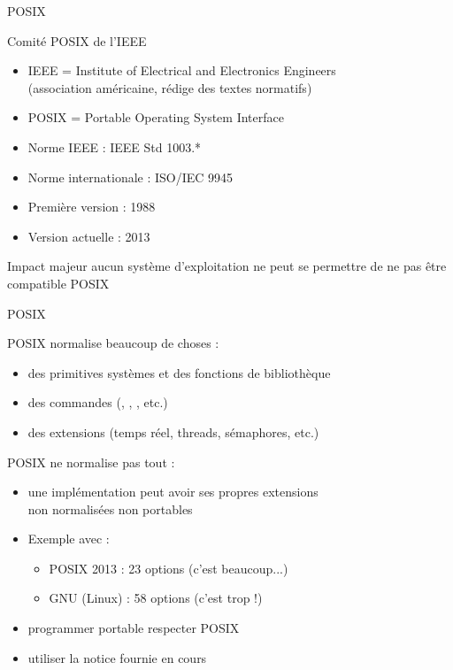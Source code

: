 \begin {frame} {POSIX}

    Comité POSIX de l’IEEE
    \begin {itemize}
	\item IEEE = Institute of Electrical and Electronics Engineers
	    \\
	    (association américaine, rédige des textes normatifs)
	\item POSIX = Portable Operating System Interface
	\item Norme IEEE : IEEE Std 1003.*
	\item Norme internationale : ISO/IEC 9945
	\item Première version : 1988
	\item Version actuelle : 2013
    \end {itemize}

    \vspace* {3mm}

    Impact majeur \implique aucun système d'exploitation ne peut
    se permettre de ne pas être compatible POSIX
\end {frame}

\begin {frame} {POSIX}

    POSIX normalise beaucoup de choses :

    \begin {itemize}
	\item des primitives systèmes et des fonctions de bibliothèque
	\item des commandes (, , , etc.)
	\item des extensions (temps réel, threads, sémaphores, etc.)
    \end {itemize}

    \vspace* {3mm}

    POSIX ne normalise pas tout :
    \begin {itemize}
	\item une implémentation peut avoir ses propres extensions \\
	    \implique non normalisées \implique non portables
	\item Exemple avec  :
	    \begin {itemize}
		\item POSIX 2013 : 23 options (c'est beaucoup...) \\
		\item GNU (Linux) : 58 options (c'est trop !) \\
	    \end {itemize}
	\item programmer portable \implique respecter POSIX
	\item utiliser la notice fournie en cours

    \end {itemize}

\end {frame}

